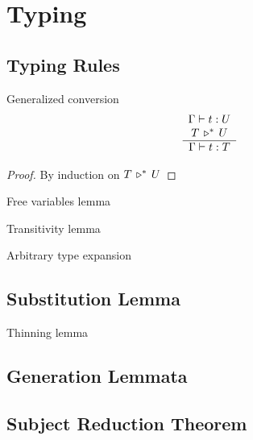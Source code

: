 \section{Typing}

\subsection{Typing Rules}


\begin{theorem}
  \label{generalizedconversion}
  Generalized conversion
  $$
  \begin{array}{c} 
    \Gamma \vdash t : U
    \\
    T \,\triangleright^*\, U
   \\ \hline 
    \Gamma \vdash t : T
  \end{array}
  $$

  \begin{proof}
    By induction on $T \,\triangleright^*\, U$
  \end{proof}
\end{theorem}



Free variables lemma

Transitivity lemma

Arbitrary type expansion


\subsection{Substitution Lemma}


Thinning lemma

\subsection{Generation Lemmata}


\subsection{Subject Reduction Theorem}

